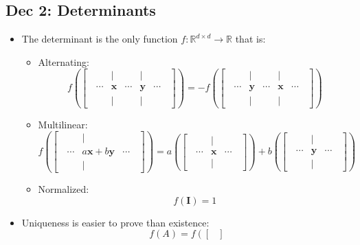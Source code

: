 \documentclass[10pt, oneside]{article}
\newcommand{\R}{\mathbb{R}}
\renewcommand{\vec}[1]{\mathbf{#1}}
\newcommand{\mat}[1]{\mathbf{#1}}
\begin{document}
\subsection{Dec 2: Determinants}
\begin{itemize}
    \item The determinant is the only function $f : \R^{d \times d} \rightarrow \R$ that is:
    \begin{itemize}
        \item Alternating:
            \[f\left(\begin{bmatrix}
                & |  &   &  |  &\\
            \;\;\cdots&\vec{x}&\cdots&\vec{y}&\cdots\;\;\\
                & |  &   &  |  &    
            \end{bmatrix}\right)
            = - f\left(\begin{bmatrix}
                & |  &   &  |  &\\
            \;\;\cdots&\vec{y}&\cdots&\vec{x}&\cdots\;\;\\
                & |  &   &  |  &
            \end{bmatrix}\right)\]
        \item Multilinear:
            \[f\left(\begin{bmatrix}
                & |  &\\
            \;\;\cdots&a\vec{x}+b\vec{y}&\cdots\;\;\\
                & |  &
            \end{bmatrix}\right)
            = a\left(\begin{bmatrix}
                & |  &\\
            \;\;\cdots&\vec{x}&\cdots\;\;\\
                & |  &
            \end{bmatrix}\right)
            + b\left(\begin{bmatrix}
                & |  &\\
            \;\;\cdots&\vec{y}&\cdots\;\;\\
                & |  &
            \end{bmatrix}\right)\]
        \item Normalized:
            \[f(\mat{I}) = 1\]
    \end{itemize}
    \item Uniqueness is easier to prove than existence:
        \[f(A) = f\left(\begin{bmatrix}

\end{bmatrix}\]
\end{itemize}
\end{document}
